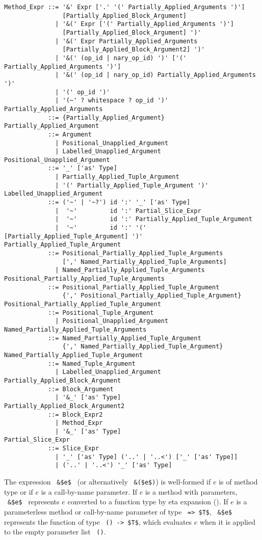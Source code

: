 \grammar\begin{lstlisting}
Method_Expr ::= '&' Expr ['.' '(' Partially_Applied_Arguments ')']
                [Partially_Applied_Block_Argument]
              | '&(' Expr ['(' Partially_Applied_Arguments ')']
                [Partially_Applied_Block_Argument] ')'
              | '&(' Expr Partially_Applied_Arguments
                [Partially_Applied_Block_Argument2] ')'
              | '&(' (op_id | nary_op_id) ')' ['(' Partially_Applied_Arguments ')']
              | '&(' (op_id | nary_op_id) Partially_Applied_Arguments ')'
              | '(' op_id ')'
              | '(~' ? whitespace ? op_id ')'
Partially_Applied_Arguments
            ::= {Partially_Applied_Argument} 
Partially_Applied_Argument
            ::= Argument
              | Positional_Unapplied_Argument
              | Labelled_Unapplied_Argument
Positional_Unapplied_Argument
            ::= '_' ['as' Type]
              | Partially_Applied_Tuple_Argument
              | '(' Partially_Applied_Tuple_Argument ')'
Labelled_Unapplied_Argument
            ::= ('~' | '~?') id ':' '_' ['as' Type]
              |  '~'         id ':' Partial_Slice_Expr
              |  '~'         id ':' Partially_Applied_Tuple_Argument
              |  '~'         id ':' '(' [Partially_Applied_Tuple_Argument] ')'
Partially_Applied_Tuple_Argument
            ::= Positional_Partially_Applied_Tuple_Arguments 
                [',' Named_Partially_Applied_Tuple_Arguments]
              | Named_Partially_Applied_Tuple_Arguments
Positional_Partially_Applied_Tuple_Arguments 
            ::= Positional_Partially_Applied_Tuple_Argument
                {',' Positional_Partially_Applied_Tuple_Argument}
Positional_Partially_Applied_Tuple_Argument
            ::= Positional_Tuple_Argument
              | Positional_Unapplied_Argument
Named_Partially_Applied_Tuple_Arguments
            ::= Named_Partially_Applied_Tuple_Argument 
                {',' Named_Partially_Applied_Tuple_Argument}
Named_Partially_Applied_Tuple_Argument
            ::= Named_Tuple_Argument
              | Labelled_Unapplied_Argument
Partially_Applied_Block_Argument
            ::= Block_Argument
              | '&_' ['as' Type]
Partially_Applied_Block_Argument2
            ::= Block_Expr2
              | Method_Expr
              | '&_' ['as' Type]
Partial_Slice_Expr
            ::= Slice_Expr
              | '_' ['as' Type] ('..' | '..<') ['_' ['as' Type]]
              | ('..' | '..<') '_' ['as' Type]
\end{lstlisting}

The expression ~\lstinline!&$e$!~ (or alternatively ~\lstinline!&($e$)!) is well-formed if $e$ is of method type or if $e$ is a call-by-name parameter. If $e$ is a method with parameters, ~\lstinline!&$e$!~ represents $e$ converted to a function type by eta expansion (). If $e$ is a parameterless method or call-by-name parameter of type ~\lstinline!=> $T$!, ~\lstinline!&$e$!~ represents the function of type ~\lstinline!() -> $T$!, which evaluates $e$ when it is applied to the empty parameter list ~\lstinline!()!. 

